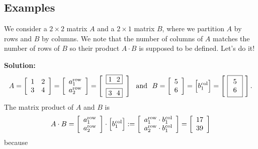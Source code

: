 \subsection{Examples}

\begin{example}
\label{ex:MatrixMultiplication01} 
We consider a $2 \times 2$ matrix $A$ and a $2 \times 1$ matrix $B$,
where we partition $A$ by rows and $B$ by columns. We note that the number of columns of $A$ matches the number of rows of $B$ so their product $A\cdot B$ is supposed to be defined. Let's do it! 
\end{example}

\textbf{Solution:}
\begin{equation}
  A=\left[\begin{array}{cc} 1 & 2 \\
3 & 4  \end{array}\right]  =   \left[\begin{array}{c} a_1^{\rm row}\\
a_2^{\rm row} \end{array}\right]  = \left[\begin{array}{c}\boxed{ 1 ~~ 2} \medskip\\
\boxed{3 ~~ 4 }\end{array}\right] ~~
\text{and}~~
    B=\left[\begin{array}{c} 5  \\ 6
\end{array}\right] = \Big[ b^{\rm col}_1 \Big] = \left[~\boxed{\begin{array}{c} 5 \\ 6\end{array} }~ \right].
\end{equation}
The matrix product of $A$ and $B$ is
\begin{equation}
    A \cdot B= \left[\begin{array}{c} a_1^{\rm row}\\
a_2^{\rm row} \end{array}\right] \cdot \Big[ b^{\rm col}_1 \Big]:=\left[  \begin{array}{c}  a_1^{\rm row} \cdot b_1^{\rm col} \\  a_2^{\rm row} \cdot b_1^{\rm col} \end{array} \right]
    = \left[\begin{array}{c} 17 \\ 39\end{array} \right]
\end{equation}
because
